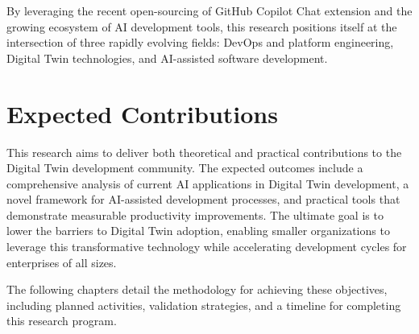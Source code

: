 By leveraging the recent open-sourcing of GitHub Copilot Chat extension and the growing ecosystem of AI development tools, this research positions itself at the intersection of three rapidly evolving fields: DevOps and platform engineering, Digital Twin technologies, and AI-assisted software development.

\section{Expected Contributions}

This research aims to deliver both theoretical and practical contributions to the Digital Twin development community. The expected outcomes include a comprehensive analysis of current AI applications in Digital Twin development, a novel framework for AI-assisted development processes, and practical tools that demonstrate measurable productivity improvements. The ultimate goal is to lower the barriers to Digital Twin adoption, enabling smaller organizations to leverage this transformative technology while accelerating development cycles for enterprises of all sizes.

The following chapters detail the methodology for achieving these objectives, including planned activities, validation strategies, and a timeline for completing this research program.